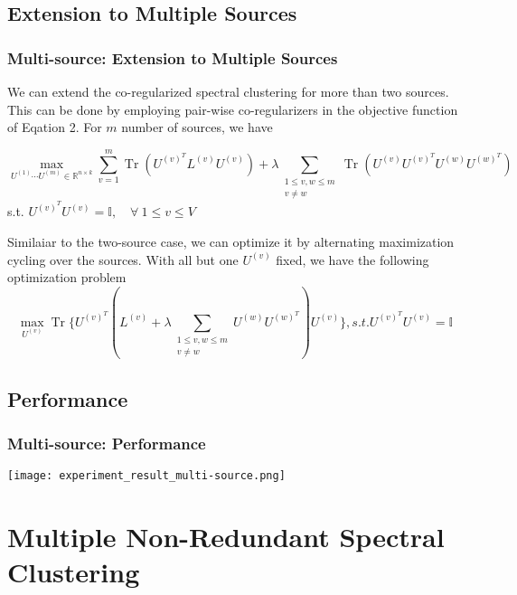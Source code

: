 \documentclass{beamer}
\DeclareMathOperator{\Tr}{Tr}
\begin{document}
\subsection{Extension to Multiple Sources}
\begin{frame}
\frametitle{Multi-source: Extension to Multiple Sources}
We can extend the co-regularized spectral clustering for more than two sources. This can be done by employing pair-wise co-regularizers in the objective function of Eqation 2. For $m$ number of sources, we have
\begin{block}{}
\begin{equation}
	\max_{U^{(1)}\cdots U^{(m)}\in\mathbb{R}^{n\times k}}\sum_{v=1}^m\Tr(U^{(v)^T}L^{(v)}U^{(v)})+\lambda\sum_{\substack{1\leq v,w\leq m\\
						   v\neq w}}\Tr(U^{(v)}U^{(v)^T}U^{(w)}U^{(w)^T})
\end{equation}
s.t. $U^{(v)^T}U^{(v)}=\mathds{I},\quad \forall~ 1\leq v\leq V$
\end{block}
Similaiar to the two-source case, we can optimize it by alternating maximization cycling over the sources. With all but one $U^{(v)}$ fixed, we have the following optimization problem
\begin{equation}
\max_{U^{(v)}}\Tr\{U^{(v)^T}(L^{(v)}+\lambda\sum_{\substack{1\leq v,w\leq m\\
						   v\neq w}}U^{(w)}U^{(w)^T})U^{(v)}\},s.t. U^{(v)^T}U^{(v)}=\mathds{I}
\end{equation}
\end{frame}

\subsection{Performance}
\begin{frame}
\frametitle{Multi-source: Performance}
\texttt{[image: experiment\_result\_multi-source.png]}
\end{frame}

\section{Multiple Non-Redundant Spectral Clustering}
\end{document}
